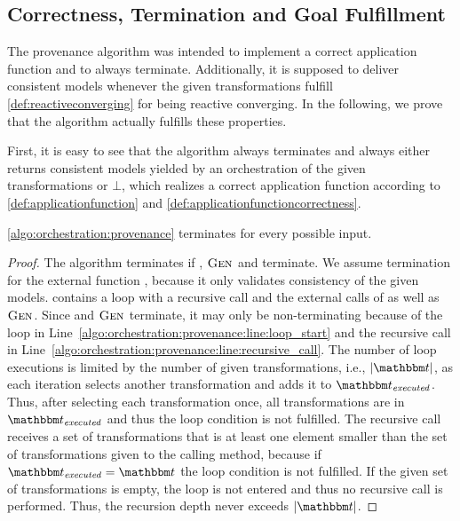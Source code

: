 \subsection{Correctness, Termination and Goal Fulfillment}

The provenance algorithm was intended to implement a correct application function and to always terminate.
Additionally, it is supposed to deliver consistent models whenever the given transformations fulfill \autoref{def:reactiveconverging} for being reactive converging.
In the following, we prove that the algorithm actually fulfills these properties.

First, it is easy to see that the algorithm always terminates and always either returns consistent models yielded by an orchestration of the given transformations or $\bot$, which realizes a correct application function according to \autoref{def:applicationfunction} and \autoref{def:applicationfunctioncorrectness}.

\begin{theorem}
    \autoref{algo:orchestration:provenance} terminates for every possible input.
\end{theorem}
\begin{proof}
    The algorithm terminates if , $\textsc{Gen}_{}$ and  terminate.
    We assume termination for the external function , because it only validates consistency of the given models.
     contains a loop with a recursive call and the external calls of  as well as $\textsc{Gen}_{}$.
    Since  and $\textsc{Gen}_{}$ terminate, it may only be non-terminating because of the loop in Line~\ref{algo:orchestration:provenance:line:loop_start} and the recursive call in Line~\ref{algo:orchestration:provenance:line:recursive_call}.
    The number of loop executions is limited by the number of given transformations, i.e., $\abs{\transformationset{T}}$, as each iteration selects another transformation and adds it to $\provalgexecuted$.
    Thus, after selecting each transformation once, all transformations are in $\provalgexecuted$ and thus the loop condition is not fulfilled.
    The recursive call receives a set of transformations that is at least one element smaller than the set of transformations given to the calling method, because if $\provalgexecuted = \transformationset{T}$ the loop condition is not fulfilled. If the given set of transformations is empty, the loop is not entered and thus no recursive call is performed. Thus, the recursion depth never exceeds $\abs{\transformationset{T}}$.
\end{proof}

